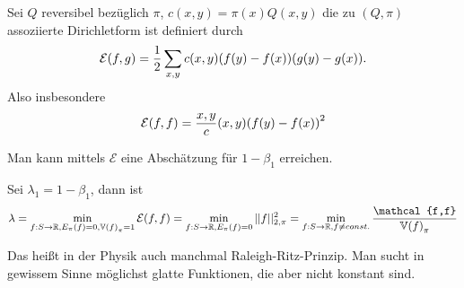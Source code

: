 \begin{definition}
	Sei $Q$ reversibel bezüglich $\pi$, $c(x,y) = \pi(x) Q(x,y)$ die zu $(Q,\pi)$ assoziierte Dirichletform ist definiert durch
	\begin{align}
		\mathcal{E}(f,g) = \frac{1}{2}\sum\limits_{x,y}c(x,y)\enb{f(y) - f(x)}\enb{g(y)- g(x)}.
	\end{align}
	Also insbesondere
	\begin{align}
		\mathcal{E}(f,f) = \frac{x,y} c(x,y) \enb{f(y)-f(x)}^2
	\end{align}
\end{definition}

Man kann mittels $\mathcal{E}$ eine Abschätzung für $1-\beta_1$	erreichen.
\begin{satz}
	Sei $\lambda_1 = 1-\beta_1$, dann ist  
	\begin{align}
		\lambda = \min\limits_{f:S\to \RR, E_\pi(f) = 0, \Var{f}_{\pi} = 1} \mathcal{E}(f,f) = \min\limits_{f:S\to \RR, E_\pi (f) = 0} ||f||^2_{2,\pi} = \min\limits_{f:S \to \RR, f \neq const.} \frac{\mathcal{f,f}}{\Var{f}_{\pi}}
	\end{align}
\end{satz}
\begin{bemerkung}
	Das heißt in der Physik auch manchmal Raleigh-Ritz-Prinzip. Man sucht in gewissem Sinne möglichst glatte Funktionen, die aber nicht konstant sind.
\end{bemerkung}
